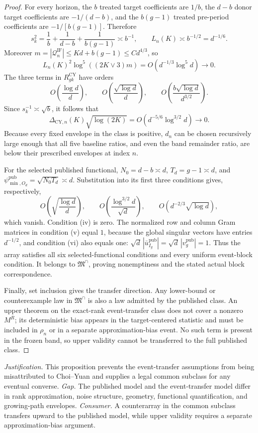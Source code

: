 \documentclass{article}
\begin{document}
\begin{proof}
For every horizon, the \(b\) treated target coefficients are \(1/b\),
the \(d-b\) donor target coefficients are \(-1/(d-b)\), and the
\(b(g-1)\) treated pre-period coefficients are
\(-1/[b(g-1)]\).  Therefore
\[
 s_k^2=\frac1b+\frac1{d-b}+\frac1{b(g-1)}\asymp b^{-1},
 \qquad L_n(K)\asymp b^{-1/2}=d^{-1/6}.
\]
Moreover \(m=|\mathcal Q_n^{\mathrm{IF}}|\le Kd+b(g-1)\le Cd^{4/3}\),
so
\[
 L_n(K)^2\log^5((2K\vee3)m)=O(d^{-1/3}\log^5d)\to0.
\]
The three terms in \(R_{gk}^{\mathrm{CY}}\) have orders
\[
 O\!\left(\frac{\log d}{d}\right),\qquad
 O\!\left(\frac{\sqrt{\log d}}d\right),\qquad
 O\!\left(\frac{b\sqrt{\log d}}{d^{3/2}}\right).
\]
Since \(s_k^{-1}\asymp\sqrt b\), it follows that
\[
 \Delta_{\mathrm{CY},n}(K)\sqrt{\log(2K)}
 =O(d^{-5/6}\log^{3/2}d)\to0.
\]
Because every fixed envelope in the class is positive, \(d_n\) can be
chosen recursively large enough that all five baseline ratios, and even
the band remainder ratio, are below their prescribed envelopes at index
\(n\).

For the selected published functional, \(N_0=d-b\asymp d\),
\(T_d=g-1\asymp d\), and
\(\psi^{\mathrm{pub}}_{\min,O_d}=\sqrt{N_0T_d}\asymp d\).  Substitution into its first
three conditions gives, respectively,
\[
 O\!\left(\sqrt{\frac{\log d}{d}}\right),\qquad
 O\!\left(\frac{\log^{3/2}d}{\sqrt d}\right),\qquad
 O\!\left(d^{-2/3}\sqrt{\log d}\right),
\]
which vanish.  Condition (iv) is zero.  The normalized row and column
Gram matrices in condition (v) equal \(1\), because the global singular
vectors have entries \(d^{-1/2}\), and condition (vi) also equals one:
\(\sqrt d\,|\bar u^{\mathrm{pub}}_{I_g}|=\sqrt d\,|v_g^{\mathrm{pub}}|=1\).  Thus the array satisfies
all six selected-functional conditions and every uniform event-block
condition.  It belongs to \(\mathfrak M^\cap\), proving nonemptiness and
the stated actual block correspondence.

Finally, set inclusion gives the transfer direction.  Any lower-bound or
counterexample law in \(\mathfrak M^\cap\) is also a law admitted by the
published class.  An upper theorem on the exact-rank event-transfer class
does not cover a nonzero \(M^R\); its deterministic bias appears in the
target-centered statistic and must be included in \(\rho_n\) or in a
separate approximation-bias event.  No such term is present in the frozen
band, so upper validity cannot be transferred to the full published class.
\end{proof}
\par\smallskip\noindent \textit{Justification.} This proposition prevents the event-transfer assumptions from being misattributed to Choi--Yuan and supplies a legal common subclass for any eventual converse. \textit{Gap.} The published model and the event-transfer model differ in rank approximation, noise structure, geometry, functional quantification, and growing-path envelopes. \textit{Consumer.} A counterarray in the common subclass transfers upward to the published model, while upper validity requires a separate approximation-bias argument.
\end{document}
